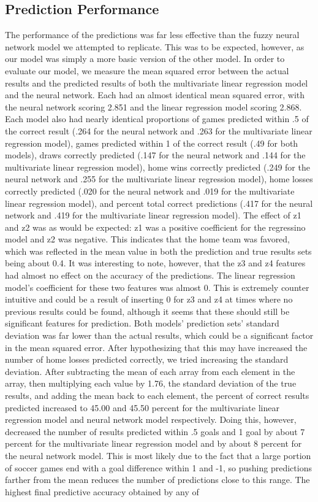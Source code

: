 \documentclass[sigconf]{acmart}
\begin{document}
\subsection{Prediction Performance}
The performance of the predictions was far less effective than the fuzzy neural network model we attempted to replicate. This was to be expected, however, as our model was simply a more basic version of the other model. In order to evaluate our model, we measure the mean squared error between the actual results and the predicted results of both the multivariate linear regression model and the neural network. Each had an almost identical mean squared error, with the neural network scoring 2.851 and the linear regression model scoring 2.868. Each model also had nearly identical proportions of games predicted within .5 of the correct result (.264 for the neural network and .263 for the multivariate linear regression model), games predicted within 1 of the correct result (.49 for both models), draws correctly predicted (.147 for the neural network and .144 for the multivariate linear regression model), home wins correctly predicted (.249 for the neural network and .255 for the multivariate linear regression model), home losses correctly predicted (.020 for the neural network and .019 for the multivariate linear regression model), and percent total correct predictions (.417 for the neural network and .419 for the multivariate linear regression model). The effect of z1 and z2 was as would be expected: z1 was a positive coefficient for the regressino model and z2 was negative. This indicates that the home team was favored, which was reflected in the mean value in both the prediction and true results sets being about 0.4. It was interesting to note, however, that the z3 and z4 features had almost no effect on the accuracy of the predictions. The linear regression model's coefficient for these two features was almost 0. This is extremely counter intuitive and could be a result of inserting 0 for z3 and z4 at times where no previous results could be found, although it seems that these should still be significant features for prediction. Both models' prediction sets' standard deviation was far lower than the actual results, which could be a significant factor in the mean squared error. After hypothesizing that this may have increased the number of home losses predicted correctly, we tried increasing the standard deviation. After subtracting the mean of each array from each element in the array, then multiplying each value by 1.76, the standard deviation of the true results, and adding the mean back to each element, the percent of correct results predicted increased to 45.00 and 45.50 percent for the multivariate linear regression model and neural network model respectively. Doing this, however, decreased the number of results predicted within .5 goals and 1 goal by about 7 percent for the multivariate linear regression model and by about 8 percent for the neural network model. This is most likely due to the fact that a large portion of soccer games end with a goal difference within 1 and -1, so pushing predictions farther from the mean reduces the number of predictions close to this range. The highest final predictive accuracy obtained by any of 
\end{document}
